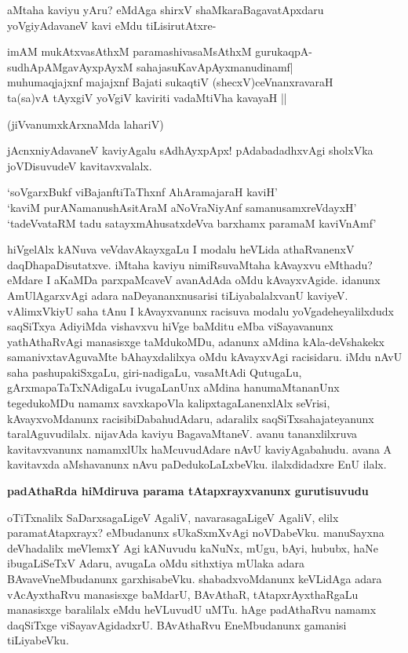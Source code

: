 \noindent
aMtaha kaviyu yAru? eMdAga shirxV shaMkaraBagavatApxdaru yoVgiyAdavaneV kavi eMdu tiLi\-sirutAtxre-

\begin{shloka}
imAM mukAtxvasAthxM paramashivasaMsAthxM gurukaqpA-\\\label{239}
sudhApAMgavAyxpAyxM sahajasuKavApAyxmanudinamf|\\
muhumaqjajxnf majajxnf Bajati sukaqtiV (shecxV)ceVnanxravaraH\\
ta(sa)vA tAyxgiV yoVgiV kaviriti vadaMtiVha kavayaH ||

\hfill{(jiVvanumxkArxnaMda lahariV)}
\end{shloka}

\noindent
jAcnxniyAdavaneV kaviyAgalu sAdhAyxpApx! pAdabadadhxvAgi sholxVka joVDisuvudeV kavitavxvalalx.

\begin{shloka}
`soVgarxBukf viBajanftiTaThxnf AhAramajaraH kaviH'\\\label{239}
`kaviM purANamanushAsitAraM aNoVraNiyAnf samanusamxreVdayxH'\\
`tadeVvataRM tadu satayxmAhusatxdeVva barxhamx paramaM kaviVnAmf'\label{239}
\end{shloka}                    

hiVgelAlx kANuva veVdavAkayxgaLu I modalu heVLida athaRvanenxV daqDhapaDisutatxve. iMtaha kaviyu nimiRsuvaMtaha kAvayxvu eMthadu? eMdare I aKaMDa parxpaMcaveV avanAdAda oMdu kAvayxvAgide. idanunx AmUlAgarxvAgi adara naDeyananxnusarisi tiLiyabalalxvanU kaviyeV. vAlimxVkiyU saha tAnu I kAvayxvanunx racisuva modalu yoVgadeheyalilxdudx saqSiTxya AdiyiMda vishavxvu hiVge baMditu eMba viSayavanunx yathAthaRvAgi manasisxge taMdukoMDu, adanunx aMdina kAla-deVshakekx samanivxtavAguvaMte bAhayxdalilxya oMdu kAvayxvAgi racisidaru. iMdu nAvU saha pashupakiSxgaLu, giri-nadigaLu, vasaMtAdi QutugaLu, gArxmapaTaTxNAdigaLu ivugaLanUnx aMdina hanumaMtananUnx tegedukoMDu namamx savxkapoVla kalipxtagaLanenxlAlx seVrisi, kAvayxvoMdanunx racisibiDabahudAdaru, adaralilx saqSiTxsahajateyanunx taralAguvu\-dilalx. nijavAda kaviyu BagavaMtaneV. avanu tananxlilxruva kavitavxvanunx namamxlUlx haMcuvudAdare nAvU kaviyAgabahudu. avana A kavitavxda aMshavanunx nAvu paDedukoLaLxbeVku. ilalxdidadxre EnU ilalx.

{\bigskip
\noindent
{\large\bf padAthaRda hiMdiruva parama tAtapxrayxvanunx gurutisuvudu}}\label{page240}
\medskip

\noindent
oTiTxnalilx SaDarxsagaLigeV AgaliV, navarasagaLigeV AgaliV, elilx paramatAtapxrayx? eMbudanunx sU\-kaSxmXvAgi noVDabeVku. manuSayxna deVhadalilx meVlemxY Agi kANuvudu kaNuNx, mUgu, bAyi, hububx, haNe ibugaLiSeTxV Adaru, avugaLa oMdu sithxtiya mUlaka adara BAvaveVneMbudanunx garxhisabeVku. shabadx\-voMdanunx keVLidAga adara vAcAyxthaRvu manasisxge baMdarU, BAvAthaR, tAtapxrAyxthaRgaLu manasisxge bara\-lilalx eMdu heVLuvudU uMTu. hAge padAthaRvu namamx daqSiTxge viSayavAgidadxrU. BAvA\-thaRvu EneMbudanunx gamanisi tiLiyabeVku.

